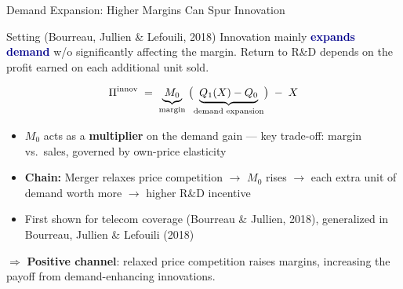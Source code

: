 \documentclass[10pt, aspectratio=169]{beamer}
\newcommand{\pos}[1]{\textcolor{softgreen}{#1}}
\newcommand{\highlight}[1]{\textcolor{darkblue}{\textbf{#1}}}
\begin{document}
\begin{frame}{Demand Expansion: Higher Margins Can Spur Innovation}
\small
\begin{block}{\small Setting (Bourreau, Jullien \& Lefouili, 2018)}
\footnotesize Innovation mainly \highlight{expands demand} w/o significantly affecting the margin. Return to R\&D depends on the profit earned on each additional unit sold.
\end{block}
\vspace{0.15em}
\[
\Pi^{\text{innov}} \;=\; \underbrace{M_0}_{\text{\scriptsize margin}}\;\bigl(\underbrace{Q_1(X)-Q_0}_{\text{\scriptsize demand expansion}}\bigr)\;-\;X
\]
\vspace{0.1em}
\begin{itemize}\setlength{\itemsep}{0.2em}
  \item $M_0$ acts as a \textbf{multiplier} on the demand gain --- key trade-off: margin vs.\ sales, governed by own-price elasticity
  \item \textbf{Chain:} Merger relaxes price competition $\to$ $M_0$ \pos{rises} $\to$ each extra unit of demand worth more $\to$ \pos{higher R\&D incentive}
  \item First shown for telecom coverage (Bourreau \& Jullien, 2018), generalized in Bourreau, Jullien \& Lefouili (2018)
\end{itemize}
\vspace{0.15em}
$\Rightarrow$ \textbf{Positive channel}: relaxed price competition raises margins, increasing the payoff from demand-enhancing innovations.
\end{frame}
\end{document}
